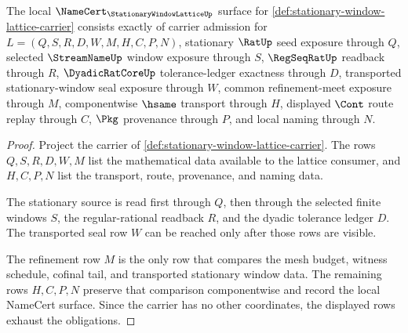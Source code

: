 \begin{theorem}
\label{thm:stationary-window-lattice-namecert-obligations}
The local $\NameCert_{\StationaryWindowLatticeUp}$ surface for \autoref{def:stationary-window-lattice-carrier} consists exactly of carrier admission for $L=(Q,S,R,D,W,M,H,C,P,N)$, stationary $\RatUp$ seed exposure through $Q$, selected $\StreamNameUp$ window exposure through $S$, $\RegSeqRatUp$ readback through $R$, $\DyadicRatCoreUp$ tolerance-ledger exactness through $D$, transported stationary-window seal exposure through $W$, common refinement-meet exposure through $M$, componentwise $\hsame$ transport through $H$, displayed $\Cont$ route replay through $C$, $\Pkg$ provenance through $P$, and local naming through $N$.
\end{theorem}
\begin{proof}
Project the carrier of \autoref{def:stationary-window-lattice-carrier}. The rows $Q,S,R,D,W,M$ list the mathematical data available to the lattice consumer, and $H,C,P,N$ list the transport, route, provenance, and naming data.

The stationary source is read first through $Q$, then through the selected finite windows $S$, the regular-rational readback $R$, and the dyadic tolerance ledger $D$. The transported seal row $W$ can be reached only after those rows are visible.

The refinement row $M$ is the only row that compares the mesh budget, witness schedule, cofinal tail, and transported stationary window data. The remaining rows $H,C,P,N$ preserve that comparison componentwise and record the local NameCert surface. Since the carrier has no other coordinates, the displayed rows exhaust the obligations.
\end{proof}

